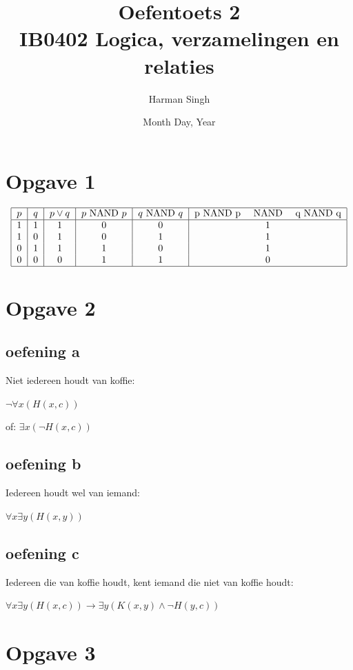 \documentclass[11pt, a4paper]{article}
\title{Oefentoets 2 \\ IB0402 Logica, verzamelingen en relaties}
\author{Harman Singh}
\date{Month Day, Year}
\begin{document}
\maketitle

\pagebreak
\section*{Opgave 1}

\[
\begin{tabular}{|c|c|c|c|c|c|c|c|c|c|}
	\hline
	$p$ & $q$ & ${p}\lor{q}$ &${p}\text{ NAND }{p}$ & ${q}\text{ NAND }{q}$ & {p}\text{ NAND }{p} \quad  NAND  \quad {q}\text{ NAND }{q} \\
	\hline
	1 & 1 & 1 & 0 & 0 & 1  \\
	1 & 0 & 1 & 0 & 1 & 1   \\
	0 & 1 & 1 & 1 & 0 & 1   \\
	0 & 0 & 0 & 1 & 1 & 0   \\
	\hline
\end{tabular}
\]



\pagebreak
\section*{Opgave 2}
\subsection*{oefening a}

Niet iedereen houdt van koffie:

$\neg \forall x (H(x,c))$

of: $\exists x (\neg H(x,c))$

\subsection*{oefening b}
Iedereen houdt wel van iemand:

$\forall x \exists y (H(x,y))$


\subsection*{oefening c}
Iedereen die van koffie houdt, kent iemand die niet van koffie houdt:

$\forall x \exists y(H(x,c)) \rightarrow  \exists y (K(x,y) \land \neg H(y,c))$


\pagebreak
\section*{Opgave 3}
\end{document}
